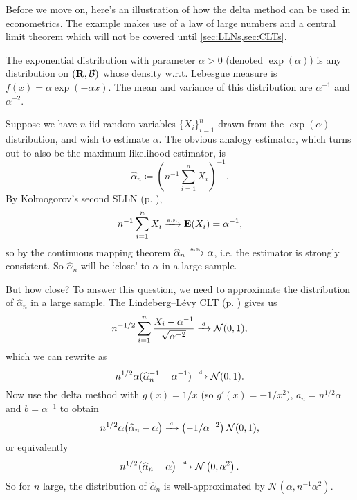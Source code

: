 \documentclass[11pt,letterpaper,reqno,oneside]{article}
\begin{document}
Before we move on, here's an illustration of how the delta method can be used in econometrics. The example makes use of a law of large numbers and a central limit theorem which will not be covered until \cref{sec:LLNs,sec:CLTs}.
%
\begin{example}[$\mathrm{exp}(\alpha)$ ML estimator]
	The exponential distribution with parameter $\alpha>0$ (denoted $\mathrm{\exp}(\alpha)$) is any distribution on $(\mathbf{R},\mathcal{B})$ whose density w.r.t. Lebesgue measure is $f(x) = \alpha \exp( - \alpha x )$. The mean and variance of this distribution are $\alpha^{-1}$ and $\alpha^{-2}$.

	Suppose we have $n$ iid random variables $\{ X_i \}_{i=1}^n$ drawn from the $\mathrm{\exp}(\alpha)$ distribution, and wish to estimate $\alpha$. The obvious analogy estimator, which turns out to also be the maximum likelihood estimator, is
	\begin{equation*}
		\widehat{\alpha}_n \coloneqq \left( n^{-1} \sum_{i=1}^n X_i \right)^{-1} .
	\end{equation*}
	By Kolmogorov's second SLLN (p. \pageref{theorem:Kolmogorov_2nd_SLLN}),
	\begin{equation*}
		n^{-1} \sum_{i=1}^n X_i \xrightarrow{{\scriptscriptstyle \mathrm{a.s.}}} \mathbf{E}(X_i) = \alpha^{-1} ,
	\end{equation*}
	so by the continuous mapping theorem $\widehat{\alpha}_n \xrightarrow{{\scriptscriptstyle \mathrm{a.s.}}} \alpha$, i.e. the estimator is strongly consistent. So $\widehat{\alpha}_n$ will be `close' to $\alpha$ in a large sample.

	But how close? To answer this question, we need to approximate the distribution of $\widehat{\alpha}_n$ in a large sample. The Lindeberg--Lévy CLT (p. \pageref{theorem:Lindeberg-Levy}) gives us
	\begin{equation*}
		n^{-1/2} \sum_{i=1}^n \frac{ X_i - \alpha^{-1} }{ \sqrt{ \alpha^{-2} } } 
		\xrightarrow{{\scriptscriptstyle \mathrm{\;d\;}}} \mathcal{N}(0,1) ,
	\end{equation*}
	which we can rewrite as
	\begin{equation*}
		n^{1/2} \alpha ( \widehat{\alpha}_n^{-1} - \alpha^{-1} ) \xrightarrow{{\scriptscriptstyle \mathrm{\;d\;}}} \mathcal{N}(0,1) .
	\end{equation*}
	Now use the delta method with $g(x) = 1/x$ (so $g'(x) = -1/x^2$), $a_n = n^{1/2} \alpha$ and $b = \alpha^{-1}$ to obtain
	\begin{equation*}
		n^{1/2} \alpha \bigl( \widehat{\alpha}_n - \alpha \bigr)
		\xrightarrow{{\scriptscriptstyle \mathrm{\;d\;}}} \left(-1/\alpha^{-2}\right) \mathcal{N}(0,1) ,
	\end{equation*}
	or equivalently
	\begin{equation*}
		n^{1/2} \bigl( \widehat{\alpha}_n - \alpha \bigr) 
		\xrightarrow{{\scriptscriptstyle \mathrm{\;d\;}}} \mathcal{N}\left( 0, \alpha^2 \right) .
	\end{equation*}
	So for $n$ large, the distribution of $\widehat{\alpha}_n$ is well-approximated by $\mathcal{N}\left( \alpha, n^{-1} \alpha^2 \right)$.
\end{example}
\end{document}
